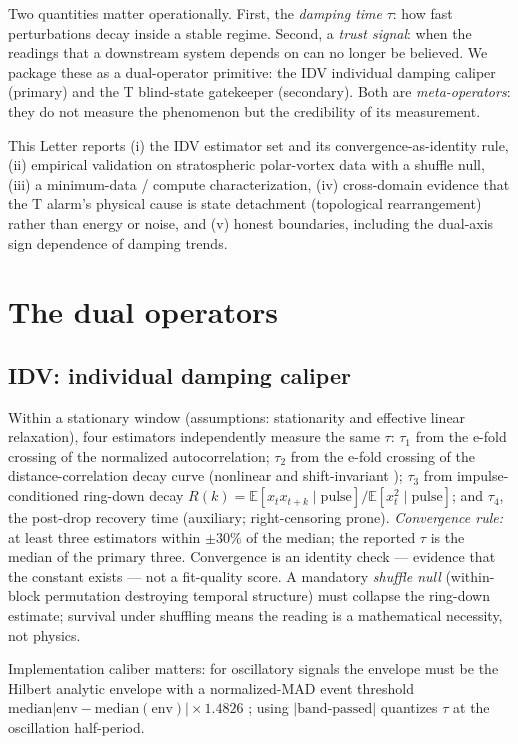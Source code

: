 \documentclass[10pt,twocolumn]{article}
\begin{document}
Two quantities matter operationally. First, the \emph{damping time}
$\tau$: how fast perturbations decay inside a stable regime. Second, a
\emph{trust signal}: when the readings that a downstream system depends on
can no longer be believed. We package these as a dual-operator primitive:
the IDV individual damping caliper (primary) and the T blind-state
gatekeeper (secondary). Both are \emph{meta-operators}: they do not measure
the phenomenon but the credibility of its measurement.

This Letter reports (i) the IDV estimator set and its
convergence-as-identity rule, (ii) empirical validation on stratospheric
polar-vortex data with a shuffle null, (iii) a minimum-data / compute
characterization, (iv) cross-domain evidence that the T alarm's physical
cause is state detachment (topological rearrangement) rather than energy or
noise, and (v) honest boundaries, including the dual-axis sign dependence
of damping trends.

\section{The dual operators}

\subsection{IDV: individual damping caliper}

Within a stationary window (assumptions: stationarity and effective linear
relaxation), four estimators independently measure the same $\tau$:
$\tau_1$ from the e-fold crossing of the normalized autocorrelation;
$\tau_2$ from the e-fold crossing of the distance-correlation decay curve
(nonlinear and shift-invariant \cite{Szekely}); $\tau_3$ from
impulse-conditioned ring-down decay
$R(k) = \mathbb{E}[x_t x_{t+k} \mid \mathrm{pulse}] /
\mathbb{E}[x_t^2 \mid \mathrm{pulse}]$;
and $\tau_4$, the post-drop recovery time (auxiliary; right-censoring
prone). \emph{Convergence rule:} at least three estimators within
$\pm 30\%$ of the median; the reported $\tau$ is the median of the primary
three. Convergence is an identity check --- evidence that the constant
exists --- not a fit-quality score. A mandatory \emph{shuffle null}
(within-block permutation destroying temporal structure) must collapse the
ring-down estimate; survival under shuffling means the reading is a
mathematical necessity, not physics.

Implementation caliber matters: for oscillatory signals the envelope must
be the Hilbert analytic envelope with a normalized-MAD event threshold
$\mathrm{median}|\mathrm{env} - \mathrm{median}(\mathrm{env})| \times
1.4826$ \cite{Marple,Bendat}; using $|\mathrm{band\text{-}passed}|$
quantizes $\tau$ at the oscillation half-period.
\end{document}
